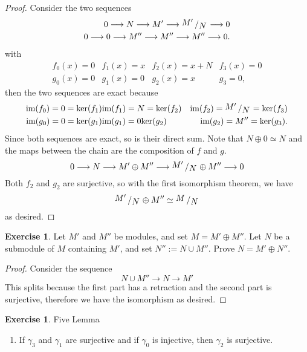\documentclass{book}
\theoremstyle{plain}
\theoremstyle{definition}
\newtheorem{exr}[thm]{Exercise}
\theoremstyle{custom_definition}
\newcommand{\bigslant}[2]{{\raisebox{.2em}{$#1$}\left/\raisebox{-.2em}{$#2$}\right.}}
\begin{document}
\begin{proof}
  Consider the two sequences
  \begin{align}
    0 \longrightarrow N \longrightarrow M' \longrightarrow \bigslant{M'}{N} \longrightarrow 0 \\
    0 \longrightarrow 0 \longrightarrow M'' \longrightarrow M'' \longrightarrow M'' \longrightarrow 0 \text{.}
  \end{align}
  with
  \begin{align}
    f_0(x) = 0 & f_1(x) = x & f_2(x) = x + N & f_3(x) = 0 \\
    g_0(x) = 0 & g_1(x) = 0 & g_2(x) = x & g_3 = 0 \text{,}
  \end{align}
  then the two sequences are exact because
  \begin{align}
    \text{im}(f_0) = 0 = \text{ker}(f_1) & \text{im}(f_1) = N = \text{ker}(f_2) & \text{im}(f_2) = \bigslant{M'}{N} = \text{ker}(f_3) \\
    \text{im}(g_0) = 0 = \text{ker}(g_1) & \text{im}(g_1) = 0 \text{ker}(g_2) & \text{im}(g_2) = M'' = \text{ker}(g_3).
  \end{align}
  Since both sequences are exact, so is their direct sum. Note that \(N \oplus 0 \simeq N\) and the maps between the chain are the composition of \(f\) and \(g\).
  \begin{equation}
    0 \longrightarrow N \longrightarrow M' \oplus M'' \longrightarrow \bigslant{M'}{N} \oplus M'' \longrightarrow 0
  \end{equation}
  Both \(f_2\) and \(g_2\) are surjective, so with the first isomorphism theorem, we have
  \begin{equation}
    \bigslant{M'}{N} \oplus M'' \simeq \bigslant{M}{N}
  \end{equation}
  as desired.
\end{proof}

\begin{exr}
  Let \(M'\) and \(M''\) be modules, and set \(M = M' \oplus M''\). Let \(N\) be a submodule of \(M\) containing \(M'\), and set \(N'' := N \cup M''\). Prove \(N = M' \oplus N''\).
\end{exr}

\begin{proof}
  Consider the sequence
  \begin{equation}
    N \cup M'' \longrightarrow N \longrightarrow M'
  \end{equation}
  This splits because the first part has a retraction and the second part is surjective, therefore we have the isomorphism as desired.
\end{proof}

\begin{exr}
  Five Lemma
  \begin{enumerate}
    \item If \(\gamma_3\) and \(\gamma_1\) are surjective and if \(\gamma_0\) is injective, then \(\gamma_2\) is surjective. 
  \end{enumerate}
\end{exr}
\end{document}
